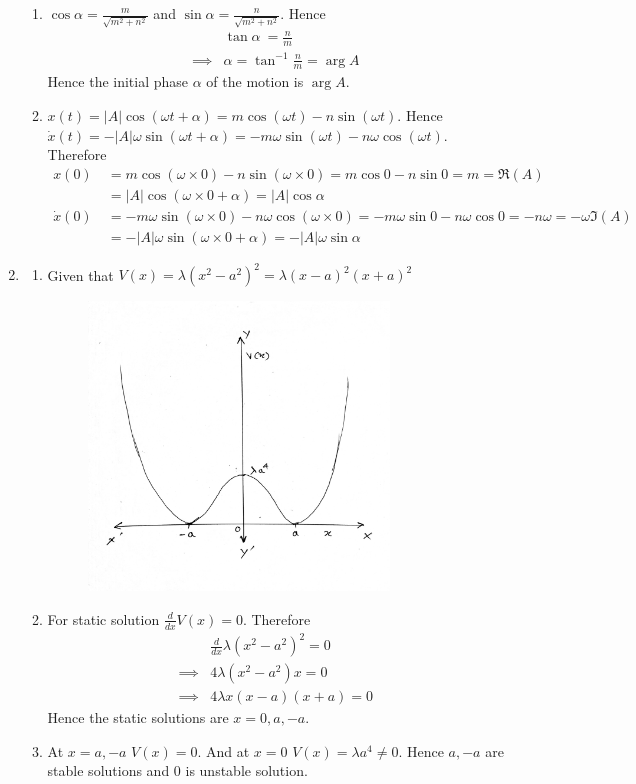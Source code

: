 \documentclass{article}
\begin{document}
\begin{enumerate}
\begin{enumerate}
		\item $\cos\alpha=\frac{m}{\sqrt{m^2+n^2}}$ and $\sin\alpha=\frac{n}{\sqrt{m^2+n^2}}$. 	Hence\begin{align*}
			& \tan\alpha\ = \frac{n}{m}\\
			\implies & \alpha=\tan^{-1}\frac{n}{m}=\arg A
		\end{align*}Hence the initial phase $\alpha$ of the motion is $\arg A$.
	\item $x(t)=|A|\cos(\omega t +\alpha)=m\cos (\omega t) - n\sin(\omega t)$. Hence $\dot{x}(t)=-|A|\omega\sin(\omega t +\alpha)=-m\omega\sin(\omega t)-n\omega\cos(\omega t)$. Therefore \begin{align*}
		x(0)\ &=m\cos(\omega\times 0)-n\sin(\omega \times 0)=m\cos 0 -n\sin 0=m=\Re(A)\\
		& =|A|\cos(\omega \times 0 +\alpha)=|A|\cos\alpha\\
		\dot{x}(0)\ &=-m\omega\sin(\omega\times 0)-n\omega\cos(\omega \times 0)=-m\omega\sin 0 -n\omega\cos 0=-n\omega=-\omega\Im(A)\\
		&= -|A|\omega\sin(\omega \times 0 +\alpha)=-|A|\omega\sin\alpha
	\end{align*}
		\end{enumerate}
	\item \begin{enumerate}
		\item Given that $V(x)=\lambda(x^2-a^2)^2=\lambda(x-a)^2(x+a)^2$\begin{figure}[h]
			\centering
			\includegraphics[width=8cm]{1.jpg}
			
		\end{figure}
	\item For static solution $\frac{d}{dx}V(x)=0$. Therefore \begin{align*}
		& \frac{d}{dx}\lambda(x^2-a^2)^2=0\\
		\implies & 4\lambda(x^2-a^2)x=0\\
		\implies & 4\lambda x(x-a)(x+a)=0
	\end{align*}Hence the static solutions are $x=0,a,-a$. 
\item At $x=a,-a$ $V(x)=0$. And at $x=0$ $V(x)=\lambda a^4\neq 0$. Hence $a,-a$ are stable solutions and $0$ is unstable solution.
	\end{enumerate}
	

\end{enumerate}
\end{document}
